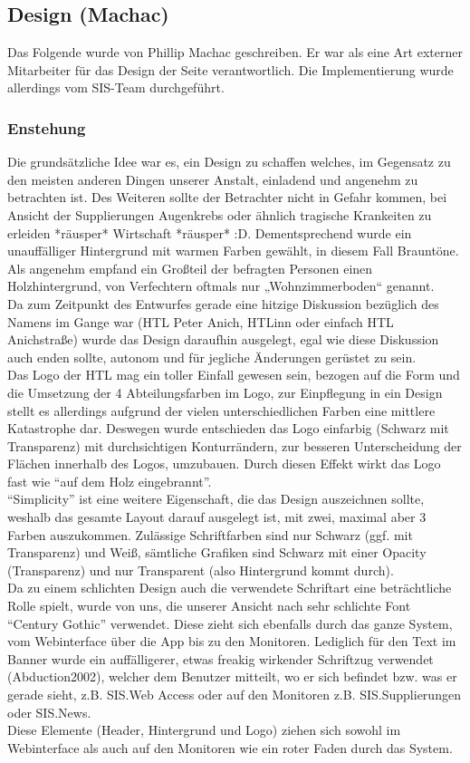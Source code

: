 \subsection{Design (Machac)}
Das Folgende wurde von Phillip Machac geschreiben. Er war als eine Art externer Mitarbeiter für das Design der Seite verantwortlich. Die Implementierung wurde allerdings vom SIS-Team durchgeführt.
\subsubsection{Enstehung}
Die grundsätzliche Idee war es, ein Design zu schaffen welches, im Gegensatz zu den meisten anderen Dingen unserer Anstalt, einladend und angenehm zu betrachten ist. Des Weiteren sollte der Betrachter nicht in Gefahr kommen, bei Ansicht der Supplierungen Augenkrebs oder ähnlich tragische Krankeiten zu erleiden *räusper* Wirtschaft *räusper* :D. Dementsprechend wurde ein unauffälliger Hintergrund mit warmen Farben gewählt, in diesem Fall Brauntöne. Als angenehm empfand ein Großteil der befragten Personen einen Holzhintergrund, von Verfechtern oftmals nur „Wohnzimmerboden“ genannt.\\
Da zum Zeitpunkt des Entwurfes gerade eine hitzige Diskussion bezüglich des Namens im Gange war (HTL Peter Anich, HTLinn oder einfach HTL Anichstraße) wurde das Design daraufhin ausgelegt, egal wie diese Diskussion auch enden sollte, autonom und für jegliche Änderungen gerüstet zu sein.\\
Das Logo der HTL mag ein toller Einfall gewesen sein, bezogen auf die Form und die Umsetzung der 4 Abteilungsfarben im Logo, zur Einpflegung in ein Design stellt es allerdings aufgrund der vielen unterschiedlichen Farben eine mittlere Katastrophe dar. Deswegen wurde entschieden das Logo einfarbig (Schwarz mit Transparenz) mit durchsichtigen Konturrändern, zur besseren Unterscheidung der Flächen innerhalb des Logos, umzubauen. Durch diesen Effekt wirkt das Logo fast wie \enquote{auf dem Holz eingebrannt}.\\
\enquote{Simplicity} ist eine weitere Eigenschaft, die das Design auszeichnen sollte, weshalb das gesamte Layout darauf ausgelegt ist, mit zwei, maximal aber 3 Farben auszukommen. Zulässige Schriftfarben sind nur Schwarz (ggf. mit Transparenz) und Weiß, sämtliche Grafiken sind Schwarz mit einer Opacity (Transparenz) und nur Transparent (also Hintergrund kommt durch).\\
Da zu  einem schlichten Design auch die verwendete Schriftart eine beträchtliche Rolle spielt, wurde von uns, die unserer Ansicht nach sehr schlichte Font \enquote{Century Gothic} verwendet. Diese zieht sich ebenfalls durch das ganze System, vom Webinterface über die App bis zu den Monitoren. Lediglich für den Text im Banner wurde ein auffälligerer, etwas freakig wirkender Schriftzug verwendet (Abduction2002), welcher dem Benutzer mitteilt, wo er sich befindet bzw. was er gerade sieht, z.B. SIS.Web Access oder auf den Monitoren z.B. SIS.Supplierungen oder SIS.News.\\
Diese Elemente (Header, Hintergrund und Logo) ziehen sich sowohl im Webinterface als auch auf den Monitoren wie ein roter Faden durch das System.\\
